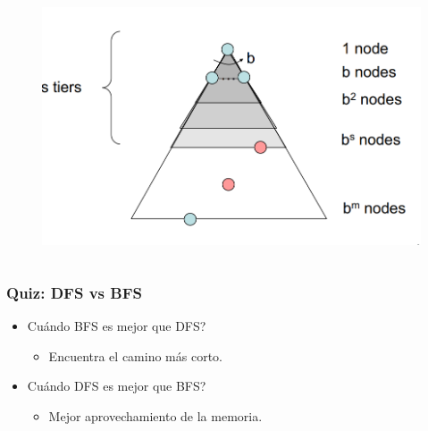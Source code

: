 \documentclass[10pt]{beamer}
\begin{document}
\begin{frame}
\begin{columns}
\begin{column}{0.5\textwidth}
\begin{figure}[!h]
        \centering
        \includegraphics[width=1\textwidth]{img/bfs1}
      \end{figure} 
    \end{column}
  \end{columns}
\end{frame}

\begin{frame}
  \frametitle{Quiz: DFS vs BFS}

  \begin{itemize}
    \item Cuándo BFS es mejor que DFS?
      \begin{itemize}
        \item Encuentra el camino más corto.
      \end{itemize}
    \item Cuándo DFS es mejor que BFS?
      \begin{itemize}
        \item Mejor aprovechamiento de la memoria.
      \end{itemize}
  \end{itemize}
  
\end{frame}
\end{document}
